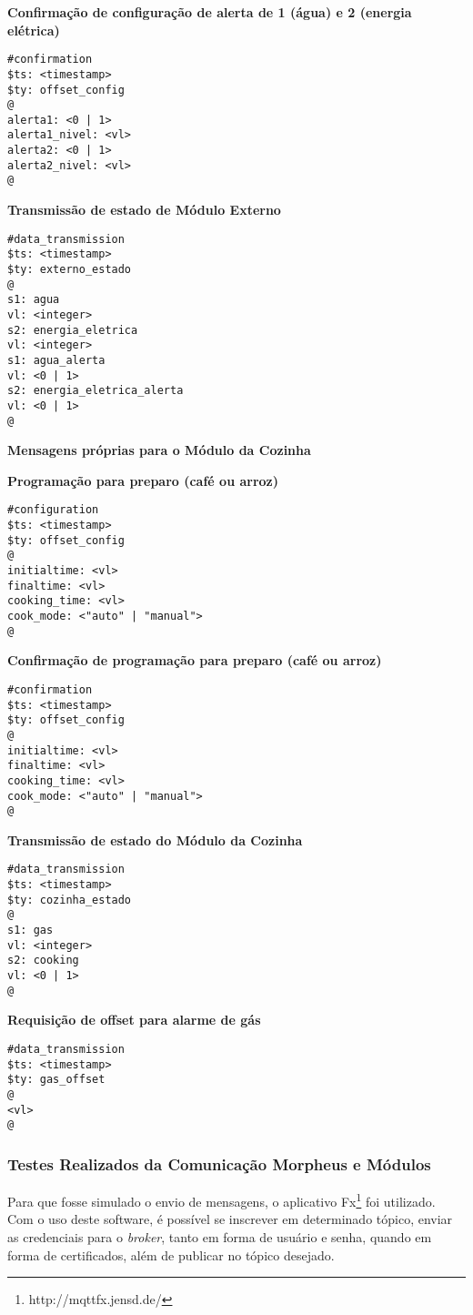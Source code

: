 \textbf{Confirmação de configuração de alerta de 1 (água) e 2 (energia elétrica)}
\begin{lstlisting}
#confirmation
$ts: <timestamp>
$ty: offset_config
@
alerta1: <0 | 1>
alerta1_nivel: <vl>
alerta2: <0 | 1>
alerta2_nivel: <vl>
@
\end{lstlisting}

\textbf{Transmissão de estado de Módulo Externo}
\begin{lstlisting}
#data_transmission
$ts: <timestamp>
$ty: externo_estado
@
s1: agua
vl: <integer>
s2: energia_eletrica
vl: <integer>
s1: agua_alerta
vl: <0 | 1>
s2: energia_eletrica_alerta
vl: <0 | 1>
@
\end{lstlisting}

\textbf{Mensagens próprias para o Módulo da Cozinha}

\textbf{Programação para preparo (café ou arroz)}
\begin{lstlisting}
#configuration
$ts: <timestamp>
$ty: offset_config
@
initialtime: <vl>
finaltime: <vl>
cooking_time: <vl>
cook_mode: <"auto" | "manual">
@
\end{lstlisting}

\textbf{Confirmação de programação para preparo (café ou arroz)}
\begin{lstlisting}
#confirmation
$ts: <timestamp>
$ty: offset_config
@
initialtime: <vl>
finaltime: <vl>
cooking_time: <vl>
cook_mode: <"auto" | "manual">
@
\end{lstlisting}

\textbf{Transmissão de estado do Módulo da Cozinha}
\begin{lstlisting}
#data_transmission
$ts: <timestamp>
$ty: cozinha_estado
@
s1: gas
vl: <integer>
s2: cooking
vl: <0 | 1>
@
\end{lstlisting}

\textbf{Requisição de offset para alarme de gás}
\begin{lstlisting}
#data_transmission
$ts: <timestamp>
$ty: gas_offset
@
<vl>
@
\end{lstlisting}

\subsubsection{Testes Realizados da Comunicação Morpheus e Módulos}

Para que fosse simulado o envio de mensagens, o aplicativo \wmqtt{} Fx\footnote{http://mqttfx.jensd.de/} foi utilizado. Com o uso deste software, é possível se inscrever em determinado tópico, enviar as credenciais para o \emph{broker}, tanto em forma de usuário e senha, quando em forma de certificados, além de publicar no tópico desejado.

